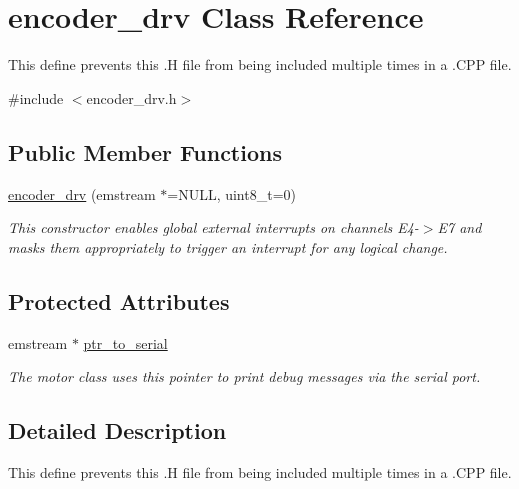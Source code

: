 \hypertarget{classencoder__drv}{\section{encoder\-\_\-drv Class Reference}
\label{classencoder__drv}
}


This define prevents this .H file from being included multiple times in a .C\-P\-P file.  




{\ttfamily \#include $<$encoder\-\_\-drv.\-h$>$}

\subsection*{Public Member Functions}
\begin{DoxyCompactItemize}
\item 
\hyperlink{classencoder__drv_a25af67f4725b47983ceb8ce4edf3296a}{encoder\-\_\-drv} (emstream $\ast$=N\-U\-L\-L, uint8\-\_\-t=0)
\begin{DoxyCompactList}\small\item\em This constructor enables global external interrupts on channels E4-\/$>$E7 and masks them appropriately to trigger an interrupt for any logical change. \end{DoxyCompactList}\end{DoxyCompactItemize}
\subsection*{Protected Attributes}
\begin{DoxyCompactItemize}
\item 
\hypertarget{classencoder__drv_a9efa5138b331c06f0821b087168d2fda}{emstream $\ast$ \hyperlink{classencoder__drv_a9efa5138b331c06f0821b087168d2fda}{ptr\-\_\-to\-\_\-serial}}\label{classencoder__drv_a9efa5138b331c06f0821b087168d2fda}

\begin{DoxyCompactList}\small\item\em The motor class uses this pointer to print debug messages via the serial port. \end{DoxyCompactList}\end{DoxyCompactItemize}


\subsection{Detailed Description}
This define prevents this .H file from being included multiple times in a .C\-P\-P file. 

